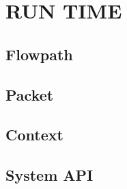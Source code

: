 \chapter{RUN TIME}
\label{runtime}

\section{Flowpath}
\label{runtime:flowpath}

\section{Packet}
\label{runtime:packet}

\section{Context}
\label{runtime:context}

\section{System API}
\label{runtime:sys-api}
